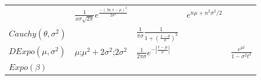 \documentclass[10pt,twocolumn,portrait]{article}
\begin{document}
\begin{longtable}[]{@{}lllll@{}}
\begin{minipage}[t]{0.20\columnwidth}
\end{minipage} & \begin{minipage}[t]{0.20\columnwidth}\raggedright
\(\frac{1}{x\sigma \sqrt{2\pi}}e^{\frac{-(\ln x-\mu)^2}{2\sigma^2}}\)\strut
\end{minipage} & \begin{minipage}[t]{0.13\columnwidth}\raggedright
\strut
\end{minipage} & \begin{minipage}[t]{0.26\columnwidth}\raggedright
\(e^{n\mu+n^2\sigma^2/2}\)\strut
\end{minipage}\tabularnewline
\begin{minipage}[t]{0.07\columnwidth}\raggedright
\(Cauchy(\theta,\sigma^2)\)\strut
\end{minipage} & \begin{minipage}[t]{0.20\columnwidth}\raggedright
\strut
\end{minipage} & \begin{minipage}[t]{0.20\columnwidth}\raggedright
\(\frac{1}{\pi\sigma}\frac1{1+(\frac{x-\theta}{\sigma})^2}\)\strut
\end{minipage} & \begin{minipage}[t]{0.13\columnwidth}\raggedright
\strut
\end{minipage} & \begin{minipage}[t]{0.26\columnwidth}\raggedright
\strut
\end{minipage}\tabularnewline
\begin{minipage}[t]{0.07\columnwidth}\raggedright
\(DExpo(\mu,\sigma^2)\)\strut
\end{minipage} & \begin{minipage}[t]{0.20\columnwidth}\raggedright
\(\mu\);\(\mu^2+2\sigma^2\);\(2\sigma^2\)\strut
\end{minipage} & \begin{minipage}[t]{0.20\columnwidth}\raggedright
\(\frac{1}{2\pi\sigma} e^{-|\frac{x-\mu}{\sigma}|}\)\strut
\end{minipage} & \begin{minipage}[t]{0.13\columnwidth}\raggedright
\strut
\end{minipage} & \begin{minipage}[t]{0.26\columnwidth}\raggedright
\(\frac{e^{\mu t}}{1-\sigma^2t^2}\)\strut
\end{minipage}\tabularnewline
\begin{minipage}[t]{0.07\columnwidth}\raggedright
\(Expo(\beta)\)\strut
\end{minipage} & \begin{minipage}[t]{0.20\columnwidth}\raggedright

\end{minipage}
\end{longtable}
\end{document}
